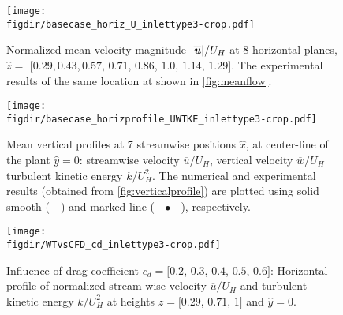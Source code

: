 \begin{sidewaysfigure}[p]
	\centering
	\texttt{[image: \\figdir/basecase\_horiz\_U\_inlettype3-crop.pdf]}
	\caption{Normalized mean velocity magnitude $|\overline{\textbf{\textit{u}}}|/U_H$ at 8 horizontal planes, $\hat{z}=$ [$0.29$,\,$0.43$,\,$0.57$, $0.71$, $0.86$, $1.0$, $1.14$, $1.29]$. The experimental results of the same location at shown in \cref{fig:meanflow}.}
	\label{fig:basecase_horiz_U}
\end{sidewaysfigure}


\begin{sidewaysfigure}[p]
	\centering
	\texttt{[image: \\figdir/basecase\_horizprofile\_UWTKE\_inlettype3-crop.pdf]}
	\caption{Mean vertical profiles at 7 streamwise positions $\hat{x}$, at center-line of the plant $\hat{y} = 0$:  streamwise velocity $\overline{u}/U_H$,  vertical velocity $\overline{w}/U_H$ turbulent kinetic energy $k/U_H^2$. The numerical and experimental results (obtained from \cref{fig:verticalprofile}) are plotted using solid smooth (---) and marked line ($-\bullet-$), respectively.}
	\label{fig:basecase_horizprofile_UTKE}
\end{sidewaysfigure}


\begin{figure}[p]
	\centering
	\texttt{[image: \\figdir/WTvsCFD\_cd\_inlettype3-crop.pdf]}
	\caption{Influence of drag coefficient $c_d = [0.2$, $0.3$, $0.4$, $0.5$, $0.6]$: Horizontal profile of normalized stream-wise velocity $\overline{u}/U_H$ and turbulent kinetic energy $k/U_H^2$ at heights $\hat{z} = [0.29$, $0.71$, $1]$ and $\hat{y}=0$.}
	\label{fig:WTvsCFD_cd}
\end{figure}

